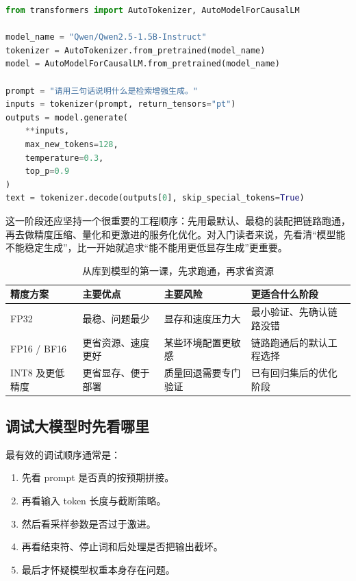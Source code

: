 \begin{lstlisting}[language=Python]
from transformers import AutoTokenizer, AutoModelForCausalLM

model_name = "Qwen/Qwen2.5-1.5B-Instruct"
tokenizer = AutoTokenizer.from_pretrained(model_name)
model = AutoModelForCausalLM.from_pretrained(model_name)

prompt = "请用三句话说明什么是检索增强生成。"
inputs = tokenizer(prompt, return_tensors="pt")
outputs = model.generate(
    **inputs,
    max_new_tokens=128,
    temperature=0.3,
    top_p=0.9
)
text = tokenizer.decode(outputs[0], skip_special_tokens=True)
\end{lstlisting}

这一阶段还应坚持一个很重要的工程顺序：先用最默认、最稳的装配把链路跑通，再去做精度压缩、量化和更激进的服务化优化。对入门读者来说，先看清“模型能不能稳定生成”，比一开始就追求“能不能用更低显存生成”更重要。

\begin{table}[H]
\centering
\small
\begin{tabularx}{\textwidth}{>{\raggedright\arraybackslash}p{2.5cm}>{\raggedright\arraybackslash}p{3cm}>{\raggedright\arraybackslash}p{3cm}>{\raggedright\arraybackslash}X}
\toprule
\textbf{精度方案} & \textbf{主要优点} & \textbf{主要风险} & \textbf{更适合什么阶段} \\
\midrule
FP32 & 最稳、问题最少 & 显存和速度压力大 & 最小验证、先确认链路没错 \\
FP16 / BF16 & 更省资源、速度更好 & 某些环境配置更敏感 & 链路跑通后的默认工程选择 \\
INT8 及更低精度 & 更省显存、便于部署 & 质量回退需要专门验证 & 已有回归集后的优化阶段 \\
\bottomrule
\end{tabularx}
\caption{从库到模型的第一课，先求跑通，再求省资源}
\label{tab:dtype-tradeoff-intro}
\end{table}

\subsection{调试大模型时先看哪里}
最有效的调试顺序通常是：
\begin{enumerate}
  \item 先看 prompt 是否真的按预期拼接。
  \item 再看输入 token 长度与截断策略。
  \item 然后看采样参数是否过于激进。
  \item 再看结束符、停止词和后处理是否把输出截坏。
  \item 最后才怀疑模型权重本身存在问题。
\end{enumerate}

